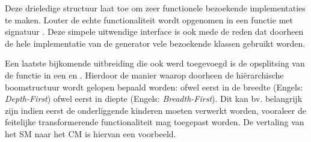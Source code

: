 Deze drieledige structuur laat toe om zeer functionele bezoekende
implementaties te maken. Louter de echte functionaliteit wordt opgenomen in een
functie met signatuur . Deze simpele uitwendige interface
is ook mede de reden dat doorheen de hele implementatie van de generator vele
bezoekende klassen gebruikt worden.

Een laatste bijkomende uitbreiding die ook werd toegevoegd is de opsplitsing
van de  functie in een  en
. Hierdoor de manier waarop doorheen de
hi\"erarchische boomstructuur wordt gelopen bepaald worden: ofwel eerst in de
breedte (Engels: \emph{Depth-First}) ofwel eerst in diepte (Engels:
\emph{Breadth-First}). Dit kan bv. belangrijk zijn indien eerst de
onderliggende kinderen moeten verwerkt worden, vooraleer de feitelijke
transformerende functionaliteit mag toegepast worden. De vertaling van het SM
naar het CM is hiervan een voorbeeld.
